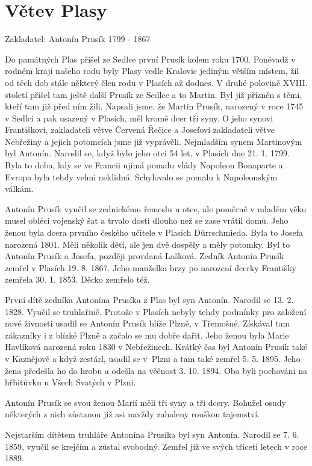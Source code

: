 \documentclass[../dejiny-rodu-prusiku.tex]{subfiles}
\begin{document}
\chapter{Větev Plasy}

Zakladatel: Antonín Prusík 1799 - 1867

Do památných Plas přišel ze Sedlce první Prusík kolem roku 1700. Poněvadž v rodném kraji našeho rodu byly Plasy vedle Kralovic jediným větším místem, žil od těch dob stále některý člen rodu v Plasích až dodnes. V dru­hé polovině XVIII. století přišel tam ještě další Pru­sík ze Sedlce a to Martin. Byl již přízněn s těmi, kteří tam již před ním žili. Napsali jsme, že Martin Pru­sík, narozený v roce 1745 v Sedlci a pak usazený v Plasích, měl kromě dcer tři syny. O jeho synovi Františkovi, zakladateli větve Červená Řečice a Josefovi zakladateli větve Nebřežiny a jejich potomcích jsme již vyprávě­li. Nejmladším synem Martinovým byl Antonín. Narodil se, když bylo jeho otci 54 let, v Plasích dne 21. 1. 1799. Byla to doba, kdy se ve Francii ujímá pomalu vlády Napoleon Bonaparte a Evropa byla tehdy velmi neklidná. Schylovalo se pomalu k Napoleonským válkám.

Antonín Prusík vyučil se zednickému řemeslu u otce, ale poměrně v mladém věku musel obléci vojenský šat a trvalo dosti dlouho než se zase vrátil domů. Jeho ženou byla dcera prvního českého učitele v Plasích Dűrrschmieda. Byla to Josefa narozená 1801. Měli několik dětí, ale jen dvě dospěly a měly potomky. Byl to Antonín Prusík a Josefa, později provdaná Lašková. Zedník Antonín Prusík zemřel v Plasích 19. 8. 1867. Jeho manželka brzy po narození dcerky Františky zemřela 30. 1. 1853. Děcko zemřelo též.

První dítě zedníka Antonína Prusíka z Plas byl syn Antonín. Narodil se 13. 2. 1828. Vyučil se truhlařině. Protože v Plasích nebyly tehdy podmínky pro založení nové živnosti usadil se Antonín Prusík blíže Plzně, v Třemošné. Získával tam zákazníky i z blízké Plzně a začalo se mu dobře dařit. Jeho ženou byla Marie Havlíková narozená roku 1830 v Nebřežinech. Krátký čas byl Antonín Prusík také v Kaznějově a když zestárl, usadil se v Plzni a tam také zemřel 5. 5. 1895. Jeho žena předešla ho do hrobu a odešla na věčnost 3. 10. 1894. Oba byli pochováni na hřbitůvku u Všech Svatých v Plzni.

Antonín Prusík se svou ženou Marií měli tři syny a tři dcery. Bohužel osudy některých z nich zůstanou již asi navždy zahaleny rouškou tajemství.

Nejstarším dítětem truhláře Antonína Prusíka byl syn Antonín. Narodil se 7. 6. 1859, vyučil se krejčím a zůstal svobodný. Zemřel již ve svých třiceti letech v roce 1889.
\end{document}
